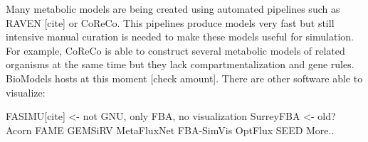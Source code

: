 Many metabolic models are being created using automated pipelines such as RAVEN [cite] or CoReCo. This pipelines produce models very fast but still intensive manual curation is needed to make these models useful for simulation. For example, CoReCo is able to construct several metabolic models of related organisms at the same time but they lack compartmentalization and gene rules. BioModels hosts at this moment [check amount]. There are other software able to visualize:

FASIMU[cite] <- not GNU, only FBA, no visualization
SurreyFBA <- old?
Acorn
FAME
GEMSiRV
MetaFluxNet
FBA-SimVis
OptFlux
SEED
More..



